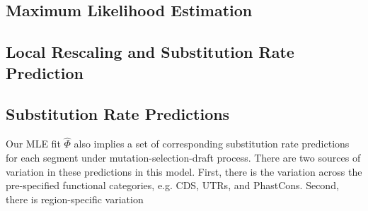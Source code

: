 \documentclass[11pt]{article}
\begin{document}
\subsection*{Maximum Likelihood Estimation}

\subsection*{Local Rescaling and Substitution Rate Prediction}


\subsection*{Substitution Rate Predictions}

Our MLE fit $\hat{\Phi}$ also implies a set of corresponding substitution rate
predictions for each segment under mutation-selection-draft process. There are
two sources of variation in these predictions in this model. First, there is
the variation across the pre-specified functional categories, e.g. CDS, UTRs,
and PhastCons. Second, there is region-specific variation 










\end{document}

